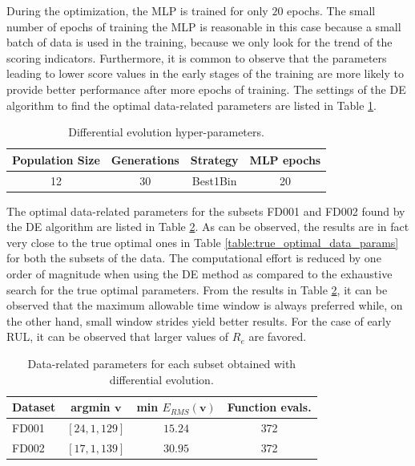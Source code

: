 \documentclass[preprint,12pt]{elsarticle}%
\begin{document}
During the optimization, the MLP is trained for only $20$ epochs. The small number of epochs of training the MLP is reasonable in this case because a small batch of data is used in the training, because we only look for the trend of the scoring indicators. Furthermore, it is common to observe that the parameters leading to lower score values in the early stages of the training are more likely to provide better performance after more epochs of training. The settings of the DE algorithm to find the optimal data-related parameters are listed in Table \ref{table:de_hyperparams}.

\begin{table}[H]
\begin{center}
\begin{tabular}[c]{llll}\hline
Population Size & Generations & Strategy & MLP epochs\\\hline
\multicolumn{1}{c}{12} & \multicolumn{1}{c}{30} & \multicolumn{1}{c}{Best1Bin \cite{Engelbrecht2007}}
& \multicolumn{1}{c}{20}\\\hline
\end{tabular}
\caption{Differential evolution hyper-parameters.}
\label{table:de_hyperparams}
\end{center}
\end{table}

The optimal data-related parameters for the subsets FD001 and FD002 found by the DE algorithm are listed in Table \ref{table:optimal_data_params}. As can be observed, the results are in fact very close to the true optimal ones in Table \ref{table:true_optimal_data_params} for both the subsets of the data. The computational effort is reduced by one order of magnitude when using the DE method as compared to the exhaustive search for the true optimal parameters. From the results in Table \ref{table:optimal_data_params}, it can be observed that the maximum allowable time window is always preferred while, on the other hand, small window strides yield better results. For the case of early RUL, it can be observed that larger values of $R_{e}$ are favored.

\begin{table}[H]
\begin{center}
\begin{tabular}[c]{l|crr}\hline
Dataset & argmin $\mathbf{v}$ & min $E_{\scriptscriptstyle RMS}(\mathbf{v})$ & Function evals.\\\hline
FD001 & $\left[  24,1,129\right]  $ & \multicolumn{1}{c}{$15.24$} & \multicolumn{1}{c}{372}\\
FD002 & $\left[  17,1,139\right]  $ & \multicolumn{1}{c}{$30.95$} & \multicolumn{1}{c}{372}\\\hline
\end{tabular}
\caption{Data-related parameters for each subset obtained with differential evolution.}
\label{table:optimal_data_params}
\end{center}
\end{table}
\end{document}
